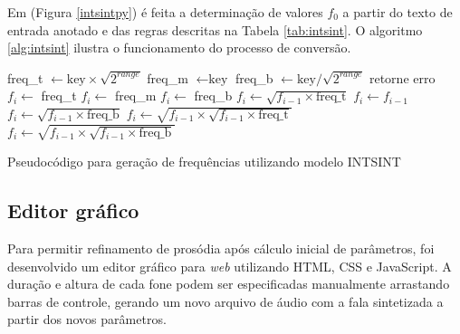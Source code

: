 Em  (Figura \ref{intsintpy}) é feita a determinação de valores $ f_0 $ a partir do texto de
entrada anotado e das regras descritas na Tabela \ref{tab:intsint}. O
algoritmo \ref{alg:intsint} ilustra o funcionamento do processo de conversão.

\begin{algorithm}[H]
\begin{algorithmic}
\STATE freq\_t $ \gets \text{key} \times \sqrt{2^{range}}$
\STATE freq\_m $ \gets \text{key} $
\STATE freq\_b $ \gets \text{key} / \sqrt{2^{range}} $
\STATE retorne erro 
\ENDIF
{}
    \STATE $ f_i \gets $ freq\_t
    \STATE $ f_i \gets $ freq\_m
    \STATE $ f_i \gets $ freq\_b
  \STATE $ f_i \gets \sqrt{f_{i - 1} \times \text{freq\_t}} $
    \STATE $ f_i \gets f_{i - 1} $
  \STATE $ f_i \gets \sqrt{f_{i - 1} \times \text{freq\_b}} $
  \STATE $ f_i \gets \sqrt{f_{i - 1} \times  \sqrt{f_{i - 1} \times \text{freq\_t}}} $
  \STATE $ f_i \gets \sqrt{f_{i - 1} \times  \sqrt{f_{i - 1} \times \text{freq\_b}}}  $
  \ENDIF
\ENDFOR
\end{algorithmic}
\caption{Pseudocódigo para geração de frequências utilizando modelo INTSINT \label{alg:intsint}}
\end{algorithm}


\subsection{Editor gráfico}
Para permitir refinamento de prosódia após cálculo inicial de parâmetros, foi
desenvolvido um editor gráfico para \emph{web} utilizando HTML, CSS e
JavaScript. A duração e altura de cada fone podem ser especificadas manualmente
arrastando barras de controle, gerando um novo arquivo de áudio com a fala
sintetizada a partir dos novos parâmetros.

